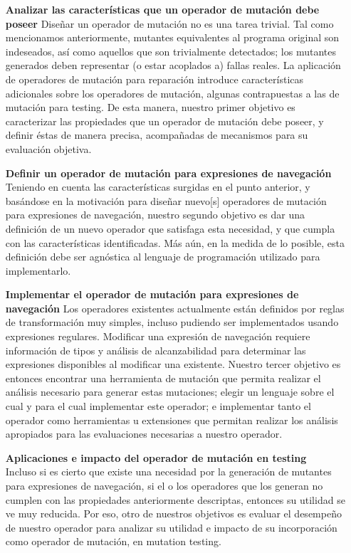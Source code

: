 \begin{enumerate}[leftmargin=.75cm,align=left,style=nextline]
	\item[\textbf{Analizar las caracter\'isticas que un operador de mutaci\'on debe poseer}] Dise\~nar un operador de mutaci\'on no es una tarea trivial. Tal como mencionamos anteriormente, mutantes equivalentes al programa original son indeseados, as\'i como aquellos que son trivialmente detectados; los mutantes generados deben representar (o estar acoplados a) fallas reales. La aplicaci\'on de operadores de mutaci\'on para reparaci\'on introduce caracter\'isticas adicionales sobre los operadores de mutaci\'on, algunas contrapuestas a las de mutaci\'on para testing. De esta manera, nuestro primer objetivo es caracterizar las propiedades que un operador de mutaci\'on debe poseer, y definir \'estas de manera precisa, acompa\~nadas de mecanismos para su evaluaci\'on objetiva. 
	
	\item[\textbf{Definir un operador de mutaci\'on para expresiones de navegaci\'on}]\mbox{}\\
	Teniendo en cuenta las caracter\'isticas surgidas en el punto anterior, y bas\'andose en la motivaci\'on para dise\~nar nuevo[s] operadores de mutaci\'on para expresiones de navegaci\'on, nuestro segundo objetivo es dar una definici\'on de un nuevo operador que satisfaga esta necesidad, y que cumpla con las caracter\'isticas identificadas. M\'as a\'un, en la medida de lo posible, esta definici\'on debe ser agn\'ostica al lenguaje de programaci\'on utilizado para implementarlo.
	
	\item[\textbf{Implementar el operador de mutaci\'on para expresiones de navegaci\'on}] Los operadores existentes actualmente est\'an definidos por reglas de transformaci\'on muy simples, incluso pudiendo ser implementados usando expresiones regulares. Modificar una expresi\'on de navegaci\'on requiere informaci\'on de tipos y an\'alisis de alcanzabilidad para determinar las expresiones disponibles al modificar una existente. Nuestro tercer objetivo es entonces encontrar una herramienta de mutaci\'on que permita realizar el an\'alisis necesario para generar estas mutaciones; elegir un lenguaje sobre el cual y para el cual implementar este operador; e implementar tanto el operador como herramientas u extensiones que permitan realizar los an\'alisis apropiados para las evaluaciones necesarias a nuestro operador.
	
	\item[\textbf{Aplicaciones e impacto del operador de mutaci\'on en testing}]\mbox{}\\
	Incluso si es cierto que existe una necesidad por la generaci\'on de mutantes para expresiones de navegaci\'on, si el o los operadores que los generan no cumplen con las propiedades anteriormente descriptas, entonces su utilidad se ve muy reducida. Por eso, otro de nuestros objetivos es evaluar el desempe\~no de nuestro operador para analizar su utilidad e impacto de su incorporaci\'on como operador de mutaci\'on, en mutation testing. 
	

\end{enumerate}
